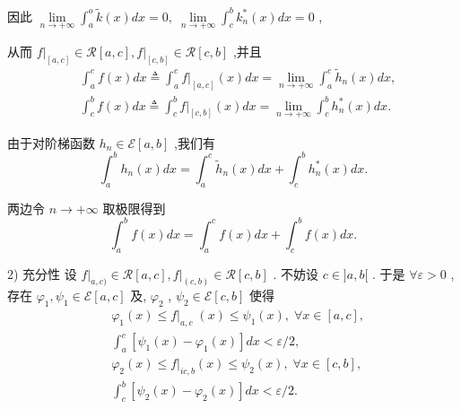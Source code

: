 因此 $\mathop{\lim }\limits_{{n \rightarrow   + \infty }}{\int }_{a}^{o}\widetilde{k}\left( x\right) {dx} = 0,\;\mathop{\lim }\limits_{{n \rightarrow   + \infty }}{\int }_{c}^{b}{k}_{n}^{ * }\left( x\right) {dx} = 0$ ,

从而 ${\left. f\right| }_{\left\lbrack  a,c\right\rbrack  } \in  \mathcal{R}\left\lbrack  {a,c}\right\rbrack  ,{\left. f\right| }_{\left\lbrack  c,b\right\rbrack  } \in  \mathcal{R}\left\lbrack  {c,b}\right\rbrack$ ,并且
\begin{align*}
	&{\int }_{a}^{c}f\left( x\right) {dx} \triangleq  {\int }_{a}^{c}{\left. f\right| }_{\left\lbrack  a,c\right\rbrack  }\left( x\right) {dx} = \mathop{\lim }\limits_{{n \rightarrow   + \infty }}{\int }_{a}^{c}{\widetilde{h}}_{n}\left( x\right) {dx},\\
	&{\int }_{c}^{b}f\left( x\right) {dx} \triangleq  {\int }_{c}^{b}{\left. f\right| }_{\left\lbrack  c,b\right\rbrack  }\left( x\right) {dx} = \mathop{\lim }\limits_{{n \rightarrow   + \infty }}{\int }_{c}^{b}{h}_{n}^{ * }\left( x\right) {dx}.
\end{align*}

由于对阶梯函数 ${h}_{n} \in  \mathcal{E}\left\lbrack  {a,b}\right\rbrack$ ,我们有
$${\int }_{a}^{b}{h}_{n}\left( x\right) {dx} = {\int }_{a}^{c}{\widetilde{h}}_{n}\left( x\right) {dx} + {\int }_{c}^{b}{h}_{n}^{ * }\left( x\right) {dx}.$$

两边令 $n \rightarrow   + \infty$ 取极限得到
$${\int }_{a}^{b}f\left( x\right) {dx} = {\int }_{a}^{c}f\left( x\right) {dx} + {\int }_{c}^{b}f\left( x\right) {dx}.$$

2) 充分性 设 ${\left. f\right| }_{a,c)} \in  \mathcal{R}\left\lbrack  {a,c}\right\rbrack  ,{\left. f\right| }_{\left( c,b\right) } \in  \mathcal{R}\left\lbrack  {c,b}\right\rbrack$ . 不妨设 $c \in  \rbrack a,b\lbrack$ . 于是 $\forall \varepsilon  > 0$ ,存在 ${\varphi }_{1},{\psi }_{1} \in  \mathcal{E}\left\lbrack  {a,c}\right\rbrack$ 及, ${\varphi }_{2}$ , ${\psi }_{2} \in  \mathcal{E}\left\lbrack  {c,b}\right\rbrack$ 使得
\begin{align*}
	&{\varphi }_{1}\left( x\right)  \leq  {\left. f\right| }_{a,c}\;\left( x\right)  \leq  {\psi }_{1}\left( x\right) ,\;\forall x \in  \left\lbrack  {a,c}\right\rbrack  ,\\
	&{\int }_{a}^{c}\left\lbrack  {{\psi }_{1}\left( x\right)  - {\varphi }_{1}\left( x\right) }\right\rbrack  {dx} < \varepsilon /2,\\
	&{\varphi }_{2}\left( x\right)  \leq  {\left. f\right| }_{{ic},b}\left( x\right)  \leq  {\psi }_{2}\left( x\right) ,\;\forall x \in  \left\lbrack  {c,b}\right\rbrack  ,\\
	&{\int }_{c}^{b}\left\lbrack  {{\psi }_{2}\left( x\right)  - {\varphi }_{2}\left( x\right) }\right\rbrack  {dx} < \varepsilon /2.
\end{align*}

